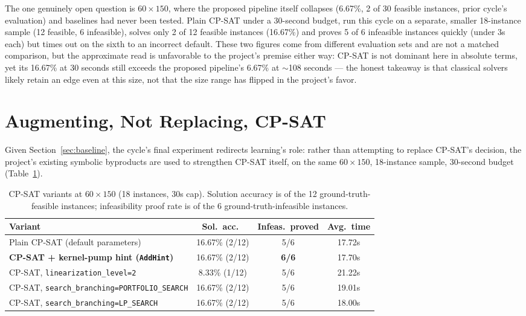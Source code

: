 \documentclass[12pt]{article}
\begin{document}
The one genuinely open question is $60\times150$, where the proposed pipeline itself collapses (6.67\%, 2 of 30 feasible instances, prior cycle's evaluation) and baselines had never been tested. Plain CP-SAT under a 30-second budget, run this cycle on a separate, smaller 18-instance sample (12 feasible, 6 infeasible), solves only 2 of 12 feasible instances (16.67\%) and proves 5 of 6 infeasible instances quickly (under 3s each) but times out on the sixth to an incorrect default. These two figures come from different evaluation sets and are not a matched comparison, but the approximate read is unfavorable to the project's premise either way: CP-SAT is not dominant here in absolute terms, yet its 16.67\% at 30 seconds still exceeds the proposed pipeline's 6.67\% at $\sim$108 seconds --- the honest takeaway is that classical solvers likely retain an edge even at this size, not that the size range has flipped in the project's favor.

\section{Augmenting, Not Replacing, CP-SAT}
\label{sec:cpsat}

Given Section~\ref{sec:baseline}, the cycle's final experiment redirects learning's role: rather than attempting to replace CP-SAT's decision, the project's existing symbolic byproducts are used to strengthen CP-SAT itself, on the same $60\times150$, 18-instance sample, 30-second budget (Table~\ref{tab:cpsat}).

\begin{table}[t]
\centering
\caption{CP-SAT variants at $60\times150$ (18 instances, 30s cap). Solution accuracy is of the 12 ground-truth-feasible instances; infeasibility proof rate is of the 6 ground-truth-infeasible instances.}
\label{tab:cpsat}
\begin{tabular}{lccc}
\toprule
Variant & Sol.\ acc.\ & Infeas.\ proved & Avg.\ time \\
\midrule
Plain CP-SAT (default parameters) & 16.67\% (2/12) & 5/6 & 17.72s \\
\textbf{CP-SAT + kernel-pump hint (\texttt{AddHint})} & 16.67\% (2/12) & \textbf{6/6} & 17.70s \\
CP-SAT, \texttt{linearization\_level=2} & 8.33\% (1/12) & 5/6 & 21.22s \\
CP-SAT, \texttt{search\_branching=PORTFOLIO\_SEARCH} & 16.67\% (2/12) & 5/6 & 19.01s \\
CP-SAT, \texttt{search\_branching=LP\_SEARCH} & 16.67\% (2/12) & 5/6 & 18.00s \\
\bottomrule
\end{tabular}
\end{table}
\end{document}
